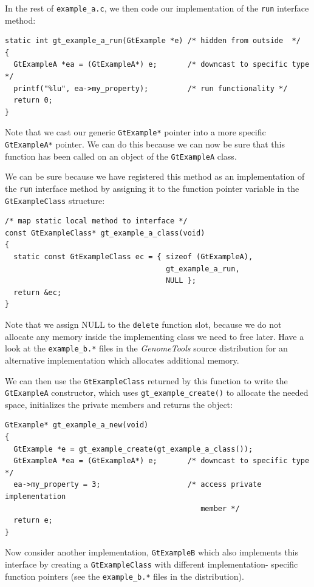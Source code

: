 \documentclass[11pt,final]{article}
\newcommand{\keyword}[1]{\lstinline{#1}}
\newcommand{\Gt}[0]{\emph{GenomeTools}\xspace}
\begin{document}
In the rest of \keyword{example_a.c}, we then code our implementation of the
\keyword{run} interface method:

\begin{lstlisting}
static int gt_example_a_run(GtExample *e) /* hidden from outside  */
{
  GtExampleA *ea = (GtExampleA*) e;       /* downcast to specific type */
  printf("%lu", ea->my_property);         /* run functionality */
  return 0;
}
\end{lstlisting}

Note that we cast our generic \keyword{GtExample*} pointer into a more specific
\keyword{GtExampleA*} pointer. We can do this because we can now be sure that
this function has been called on an object of the \keyword{GtExampleA} class.

We can be sure because we have registered this method as an implementation of
the \keyword{run} interface method by assigning it to the function pointer
variable in the \keyword{GtExampleClass} structure:

\begin{lstlisting}
/* map static local method to interface */
const GtExampleClass* gt_example_a_class(void)
{
  static const GtExampleClass ec = { sizeof (GtExampleA),
                                     gt_example_a_run,
                                     NULL };
  return &ec;
}
\end{lstlisting}

Note that we assign NULL to the \keyword{delete} function slot, because we do
not allocate any memory inside the implementing class we need to free later.
Have a look at the \keyword{example_b.*} files in the \Gt source distribution
for an alternative implementation which allocates additional memory.

We can then use the \keyword{GtExampleClass} returned by this function to write
the \keyword{GtExampleA} constructor, which uses \keyword{gt_example_create()}
to allocate the needed space, initializes the private members and returns the
object:

\begin{lstlisting}
GtExample* gt_example_a_new(void)
{
  GtExample *e = gt_example_create(gt_example_a_class());
  GtExampleA *ea = (GtExampleA*) e;       /* downcast to specific type */
  ea->my_property = 3;                    /* access private implementation
                                             member */
  return e;
}
\end{lstlisting}

Now consider another implementation, \keyword{GtExampleB} which also implements
this interface by creating a \keyword{GtExampleClass} with different implementation-
specific function pointers (see the \keyword{example_b.*} files in the
distribution).
\end{document}
